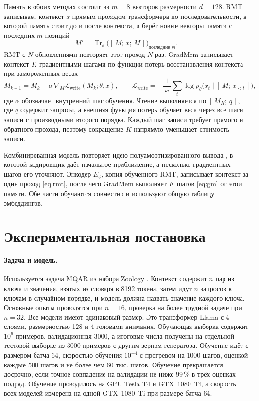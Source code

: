 \documentclass[a4paper,11pt]{article}
\newcommand{\cm}{\mathcal{L}}
\begin{document}
Память в обоих методах состоит из $m=8$ векторов размерности $d=128$. RMT \cite{rmt} записывает контекст $x$ прямым проходом трансформера по последовательности, в которой память стоит до и после контекста, и берёт новые векторы памяти с последних $m$ позиций
\begin{equation}
M' = \operatorname{Tr}_\theta\big([\,M;\,x;\,M\,]\big)_{\text{последние } m}. \label{eq:rmt}
\end{equation}
RMT с $N$ обновлениями повторяет этот проход $N$ раз. GradMem \cite{gradmem} записывает контекст $K$ градиентными шагами по функции потерь восстановления контекста при замороженных весах
\begin{equation}
M_{k+1} = M_k - \alpha\,\nabla_M \cm_{\text{write}}(M_k;\theta,x), \qquad \cm_{\text{write}} = -\frac{1}{|x|}\sum_{t}\log p_\theta\big(x_t \mid [\,M;\,x_{<t}\,]\big), \label{eq:gm}
\end{equation}
где $\alpha$ обозначает внутренний шаг обучения. Чтение выполняется по $[\,M_K;\,q\,]$, где $q$ содержит запросы, а внешняя функция потерь обучает веса через все шаги записи с производными второго порядка. Каждый шаг записи требует прямого и обратного прохода, поэтому сокращение $K$ напрямую уменьшает стоимость записи.

Комбинированная модель повторяет идею полуамортизированного вывода \cite{savae}, в которой кодировщик даёт начальное приближение, а несколько градиентных шагов его уточняют. Энкодер $E_\phi$, копия обученного RMT, записывает контекст за один проход \eqref{eq:rmt}, после чего GradMem выполняет $K$ шагов \eqref{eq:gm} от этой памяти. Обе части обучаются совместно и используют общую таблицу эмбеддингов.

\section{Экспериментальная постановка}
\paragraph{Задача и модель.} Используется задача MQAR из набора Zoology \cite{zoology}. Контекст содержит $n$ пар из ключа и значения, взятых из словаря в 8192 токена, затем идут $n$ запросов к ключам в случайном порядке, и модель должна назвать значение каждого ключа. Основные опыты проводятся при $n=16$, проверка на более трудной задаче при $n=32$. Все модели имеют одинаковый размер. Это трансформер Llama с 4 слоями, размерностью 128 и 4 головами внимания. Обучающая выборка содержит $10^6$ примеров, валидационная 3000, а итоговые числа получены на отдельной тестовой выборке из 3000 примеров с другим зерном генератора. Обучение идёт с размером батча 64, скоростью обучения $10^{-4}$ с прогревом на 1000 шагов, оценкой каждые 500 шагов и не более чем 60 тыс. шагов. Обучение прекращается досрочно, если точное совпадение на валидации не ниже 99\,\% в трёх оценках подряд. Обучение проводилось на GPU Tesla T4 и GTX~1080~Ti, а скорость всех моделей измерена на одной GTX~1080~Ti при размере батча 64.
\end{document}
